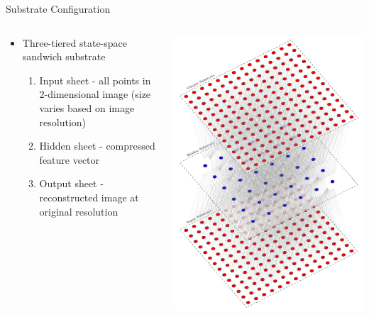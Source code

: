 \documentclass[xcolor=dvipsnames]{beamer}
\begin{document}
	\begin{frame}{Substrate Configuration}
		\begin{columns}[T]
			\begin{column}{.5\textwidth}
				\begin{itemize}
					\item Three-tiered state-space sandwich substrate
					\begin{enumerate}
						\item Input sheet - all points in 2-dimensional image (size varies based on image resolution)
						\item Hidden sheet - compressed feature vector
						\item Output sheet - reconstructed image at original resolution
					\end{enumerate}
				\end{itemize}
			\end{column}
			\begin{column}{.5\textwidth}
				\includegraphics[width=\textwidth,height=0.8\textheight,keepaspectratio]{SubstrateConfiguration/AutoencoderSubstrate}
			\end{column}
		\end{columns}	
	\end{frame}
	
\end{document}
